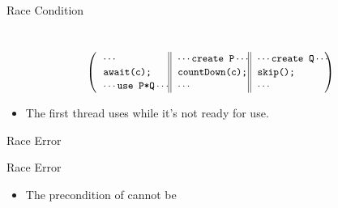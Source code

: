 \begin{frame}{Race Condition}
\begin{center}
  \begin{small}
\\\vspace{-12pt}
\[
\left(
\begin{tabular}{ 
  l@{\extracolsep{\fill}} || 
  l@{\extracolsep{\fill}} || 
  l@{\extracolsep{\fill}} }
\code{\dotonly{}} & \code{\dotsaying{create P}} & \code{\dotsaying{create Q}} \\
\code{await(c);} & \code{countDown(c);} & \code{skip();}\\
\code{\dotsaying{use P*Q}} & \code{\dotonly{}} & \code{\dotonly{}} \\
\end{tabular}\!\!\right)%
\]

\end{small}
\end{center}

\begin{itemize}
\item The first thread uses  while it's not ready for use.
\end{itemize}
\end{frame}


\begin{frame}[shrink=17]{Race Error}
\pause
    
\end{frame}

\begin{frame}[shrink=17]{Race Error}
  
  \begin{itemize}
    \item The precondition of {\CD} cannot be 
  \end{itemize}
\end{frame}

